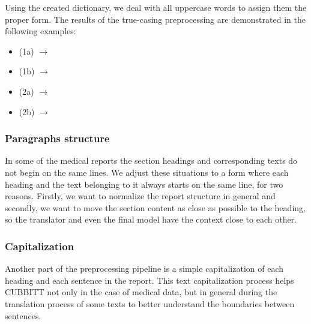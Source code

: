 Using the created dictionary, we deal with all uppercase words to assign them the proper form. The results of the true-casing preprocessing are demonstrated in the following examples:
\begin{itemize}
	\item (1a)  $\rightarrow$ \\ \phantom{(1a)} 
	\item (1b)  $\rightarrow$ \\ \phantom{(1b)} 
	\item (2a)  $\rightarrow$ \\ \phantom{(2a)} 
	\item (2b)  $\rightarrow$ \\ \phantom{(2b)} 
\end{itemize}

\subsubsection*{Paragraphs structure}
In some of the medical reports the section headings and corresponding texts do not begin on the same lines. We adjust these situations to a form where each heading and the text belonging to it always starts on the same line, for two reasons. Firstly, we want to normalize the report structure in general and secondly, we want to move the section content as close as possible to the heading, so the translator and even the final model have the context close to each other.

\subsubsection*{Capitalization}
Another part of the preprocessing pipeline is a simple capitalization of each heading and each sentence in the report. This text capitalization process helps CUBBITT not only in the case of medical data, but in general during the translation process of some texts to better understand the boundaries between sentences.

